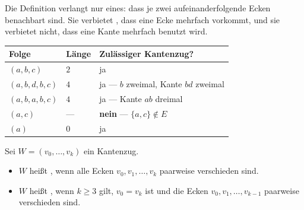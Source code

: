 \begin{merksatz}
Die Definition verlangt nur eines: dass je zwei aufeinanderfolgende Ecken benachbart sind. Sie verbietet , dass eine Ecke mehrfach vorkommt, und sie verbietet nicht, dass eine Kante mehrfach benutzt wird.

\begin{center}
\end{center}

\begin{center}
{\small
\renewcommand{\arraystretch}{1.45}
\begin{tabular}{@{}P{3.2cm}P{1.4cm}P{3.6cm}@{}}
\toprule
\textbf{Folge} & \textbf{Länge} & \textbf{Zulässiger Kantenzug?}\\
\midrule
$(a,b,c)$ & $2$ & ja\\
$(a,b,d,b,c)$ & $4$ & ja --- $b$ zweimal, Kante $bd$ zweimal\\
$(a,b,a,b,c)$ & $4$ & ja --- Kante $ab$ dreimal\\
$(a,c)$ & --- & \textcolor{akzent}{\textbf{nein}} --- $\{a,c\} \notin E$\\
$(a)$ & $0$ & ja\\
\bottomrule
\end{tabular}}
\end{center}

\begin{center}
\begin{minipage}{0.88\textwidth}
\end{minipage}
\end{center}
\end{merksatz}

\begin{definition}
Sei $W = (v_0, \ldots, v_k)$ ein Kantenzug.
\begin{itemize}[leftmargin=1.4em, itemsep=4pt]
\item $W$ heißt , wenn alle Ecken $v_0, v_1, \ldots, v_k$ paarweise verschieden sind.
\item $W$ heißt , wenn $k \ge 3$ gilt, $v_0 = v_k$ ist und die Ecken $v_0, v_1, \ldots, v_{k-1}$ paarweise verschieden sind.
\end{itemize}
\end{definition}

